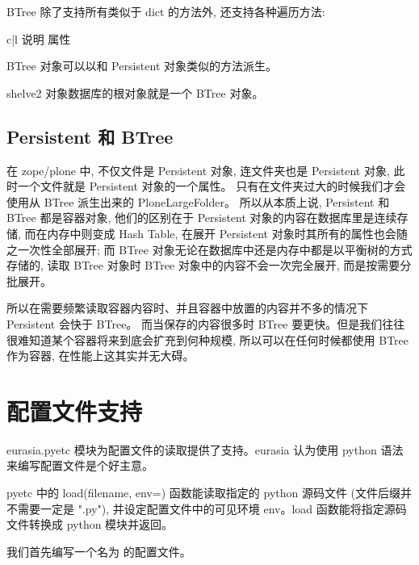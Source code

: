 \documentclass{manual}
\begin{document}
BTree 除了支持所有类似于 dict 的方法外, 还支持各种遍历方法:

\begin{tableii}{c|l}{}{ 说明 }{ 属性 }
\end{tableii}

BTree 对象可以以和 Persistent 对象类似的方法派生。

shelve2 对象数据库的根对象就是一个 BTree 对象。 

\subsection{Persistent 和 BTree}

在 zope/plone 中, 不仅文件是 Persistent 对象, 连文件夹也是 Persistent 对象,
此时一个文件就是 Persistent 对象的一个属性。
只有在文件夹过大的时候我们才会使用从 BTree 派生出来的 PloneLargeFolder。
所以从本质上说, Persistent 和 BTree 都是容器对象,
他们的区别在于 Persistent 对象的内容在数据库里是连续存储,
而在内存中则变成 Hash Table, 在展开 Persistent 对象时其所有的属性也会随之一次性全部展开;
而 BTree 对象无论在数据库中还是内存中都是以平衡树的方式存储的,
读取 BTree 对象时 BTree 对象中的内容不会一次完全展开, 而是按需要分批展开。

所以在需要频繁读取容器内容时、并且容器中放置的内容并不多的情况下 Persistent 会快于 BTree。
而当保存的内容很多时 BTree 要更快。但是我们往往很难知道某个容器将来到底会扩充到何种规模,
所以可以在任何时候都使用 BTree 作为容器, 在性能上这其实并无大碍。

\section{配置文件支持}

eurasia.pyetc 模块为配置文件的读取提供了支持。eurasia 认为使用 python 语法来编写配置文件是个好主意。

pyetc 中的 load(filename, env={}) 函数能读取指定的 python 源码文件 (文件后缀并不需要一定是 ".py"), 并设定配置文件中的可见环境 env。load 函数能将指定源码文件转换成 python 模块并返回。

我们首先编写一个名为  的配置文件。
\end{document}
